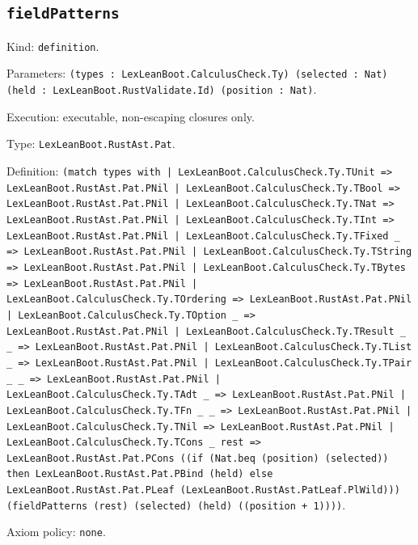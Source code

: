 \documentclass[11pt]{article}
\begin{document}
\subsection*{\texttt{fieldPatterns}}
\noindent Kind: \texttt{definition}.\par
\noindent Parameters: \texttt{(types : LexLeanBoot.CalculusCheck.Ty) (selected : Nat) (held : LexLeanBoot.RustValidate.Id) (position : Nat)}.\par
\noindent Execution: executable, non-escaping closures only.\par
\noindent Type: \texttt{LexLeanBoot.RustAst.Pat}.\par
\noindent Definition: \texttt{(match types with | LexLeanBoot.CalculusCheck.Ty.TUnit => LexLeanBoot.RustAst.Pat.PNil | LexLeanBoot.CalculusCheck.Ty.TBool => LexLeanBoot.RustAst.Pat.PNil | LexLeanBoot.CalculusCheck.Ty.TNat => LexLeanBoot.RustAst.Pat.PNil | LexLeanBoot.CalculusCheck.Ty.TInt => LexLeanBoot.RustAst.Pat.PNil | LexLeanBoot.CalculusCheck.Ty.TFixed \_ => LexLeanBoot.RustAst.Pat.PNil | LexLeanBoot.CalculusCheck.Ty.TString => LexLeanBoot.RustAst.Pat.PNil | LexLeanBoot.CalculusCheck.Ty.TBytes => LexLeanBoot.RustAst.Pat.PNil | LexLeanBoot.CalculusCheck.Ty.TOrdering => LexLeanBoot.RustAst.Pat.PNil | LexLeanBoot.CalculusCheck.Ty.TOption \_ => LexLeanBoot.RustAst.Pat.PNil | LexLeanBoot.CalculusCheck.Ty.TResult \_ \_ => LexLeanBoot.RustAst.Pat.PNil | LexLeanBoot.CalculusCheck.Ty.TList \_ => LexLeanBoot.RustAst.Pat.PNil | LexLeanBoot.CalculusCheck.Ty.TPair \_ \_ => LexLeanBoot.RustAst.Pat.PNil | LexLeanBoot.CalculusCheck.Ty.TAdt \_ => LexLeanBoot.RustAst.Pat.PNil | LexLeanBoot.CalculusCheck.Ty.TFn \_ \_ => LexLeanBoot.RustAst.Pat.PNil | LexLeanBoot.CalculusCheck.Ty.TNil => LexLeanBoot.RustAst.Pat.PNil | LexLeanBoot.CalculusCheck.Ty.TCons \_ rest => LexLeanBoot.RustAst.Pat.PCons ((if (Nat.beq (position) (selected)) then LexLeanBoot.RustAst.Pat.PBind (held) else LexLeanBoot.RustAst.Pat.PLeaf (LexLeanBoot.RustAst.PatLeaf.PlWild))) (fieldPatterns (rest) (selected) (held) ((position + 1))))}.\par
\noindent Axiom policy: \texttt{none}.\par
\end{document}
